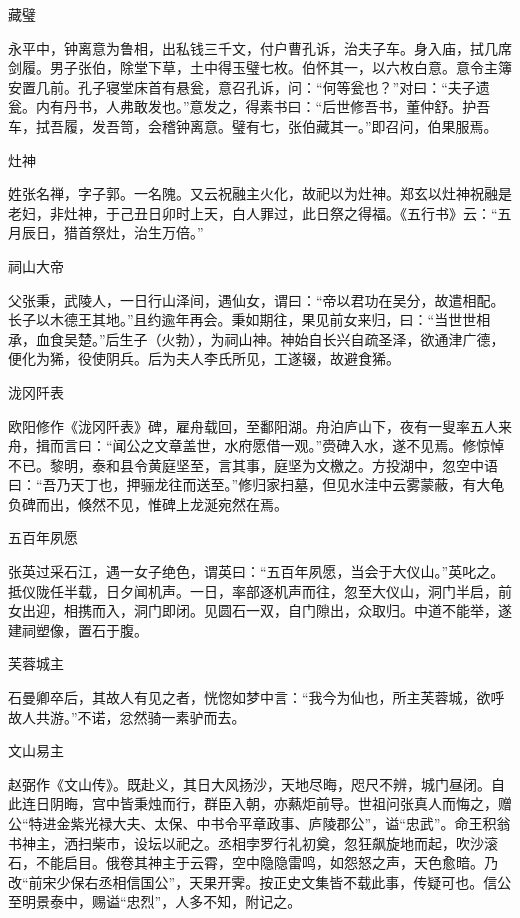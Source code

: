 \documentclass[a4paper,12pt,UTF8,twoside]{ctexbook}
\begin{document}
    藏璧
    
    永平中，钟离意为鲁相，出私钱三千文，付户曹孔诉，治夫子车。身入庙，拭几席剑履。男子张伯，除堂下草，土中得玉璧七枚。伯怀其一，以六枚白意。意令主簿安置几前。孔子寝堂床首有悬瓮，意召孔诉，问：“何等瓮也？”对曰：“夫子遗瓮。内有丹书，人弗敢发也。”意发之，得素书曰：“后世修吾书，董仲舒。护吾车，拭吾履，发吾笥，会稽钟离意。璧有七，张伯藏其一。”即召问，伯果服焉。
    
    灶神
    
    姓张名禅，字子郭。一名隗。又云祝融主火化，故祀以为灶神。郑玄以灶神祝融是老妇，非灶神，于己丑日卯时上天，白人罪过，此日祭之得福。《五行书》云：“五月辰日，猎首祭灶，治生万倍。”
    
    祠山大帝
    
    父张秉，武陵人，一日行山泽间，遇仙女，谓曰：“帝以君功在吴分，故遣相配。长子以木德王其地。”且约逾年再会。秉如期往，果见前女来归，曰：“当世世相承，血食吴楚。”后生子（火勃），为祠山神。神始自长兴自疏圣泽，欲通津广德，便化为狶，役使阴兵。后为夫人李氏所见，工遂辍，故避食狶。
    
    泷冈阡表
    
    欧阳修作《泷冈阡表》碑，雇舟载回，至鄱阳湖。舟泊庐山下，夜有一叟率五人来舟，揖而言曰：“闻公之文章盖世，水府愿借一观。”赍碑入水，遂不见焉。修惊悼不已。黎明，泰和县令黄庭坚至，言其事，庭坚为文檄之。方投湖中，忽空中语曰：“吾乃天丁也，押骊龙往而送至。”修归家扫墓，但见水洼中云雾蒙蔽，有大龟负碑而出，倏然不见，惟碑上龙涎宛然在焉。
    
    五百年夙愿
    
    张英过采石江，遇一女子绝色，谓英曰：“五百年夙愿，当会于大仪山。”英叱之。抵仪陇任半载，日夕闻机声。一日，率部逐机声而往，忽至大仪山，洞门半启，前女出迎，相携而入，洞门即闭。见圆石一双，自门隙出，众取归。中道不能举，遂建祠塑像，置石于腹。
    
    芙蓉城主
    
    石曼卿卒后，其故人有见之者，恍惚如梦中言：“我今为仙也，所主芙蓉城，欲呼故人共游。”不诺，忿然骑一素驴而去。
    
    文山易主
    
    赵弼作《文山传》。既赴义，其日大风扬沙，天地尽晦，咫尺不辨，城门昼闭。自此连日阴晦，宫中皆秉烛而行，群臣入朝，亦爇炬前导。世祖问张真人而悔之，赠公“特进金紫光禄大夫、太保、中书令平章政事、庐陵郡公”，谥“忠武”。命王积翁书神主，洒扫柴市，设坛以祀之。丞相孛罗行礼初奠，忽狂飙旋地而起，吹沙滚石，不能启目。俄卷其神主于云霄，空中隐隐雷鸣，如怨怒之声，天色愈暗。乃改“前宋少保右丞相信国公”，天果开霁。按正史文集皆不载此事，传疑可也。信公至明景泰中，赐谥“忠烈”，人多不知，附记之。
    
\end{document}

